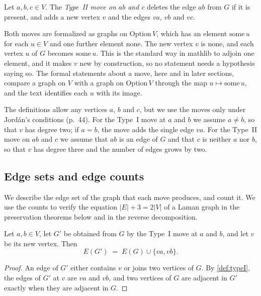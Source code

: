 \begin{definition}
  \label{def:typeII}
  \leanok
  Let $a, b, c \in V$. The \emph{Type~II move on $ab$ and $c$} deletes
  the edge $ab$ from $G$ if it is present, and adds a new vertex $v$
  and the edges $va$, $vb$ and $vc$.
\end{definition}
\begin{fmlnote}
  \label{fmlnote:henneberg-new-vertex}
  Both moves are formalized as graphs on $\mathrm{Option}\,V$, which
  has an element $\mathrm{some}\,u$ for each $u \in V$ and one further
  element $\mathrm{none}$. The new vertex $v$ is $\mathrm{none}$, and
  each vertex $u$ of $G$ becomes $\mathrm{some}\,u$. This is the
  standard way in mathlib to adjoin one element, and it makes $v$ new
  by construction, so no statement needs a hypothesis saying so. The
  formal statements about a move, here and in later sections, compare
  a graph on $V$ with a graph on $\mathrm{Option}\,V$ through the map
  $u \mapsto \mathrm{some}\,u$, and the text identifies each $u$ with
  its image.
\end{fmlnote}

The definitions allow any vertices $a$, $b$ and $c$, but we use the
moves only under Jord\'an's conditions (p.~44). For the Type~I move at
$a$ and $b$ we assume $a \ne b$, so that $v$ has degree two; if
$a = b$, the move adds the single edge $va$. For the Type~II move on
$ab$ and $c$ we assume that $ab$ is an edge of $G$ and that $c$ is
neither $a$ nor $b$, so that $v$ has degree three and the number of
edges grows by two.

\subsection{Edge sets and edge counts}

We describe the edge set of the graph that each move produces, and
count it. We use the counts to verify the equation $|E| + 3 = 2|V|$
of a Laman graph in the preservation theorems below and in the reverse
decomposition.

\begin{lemma}
  \label{lem:typeI-edgeSet}
  \leanok
  Let $a, b \in V$, let $G'$ be obtained from $G$ by the Type~I move
  at $a$ and $b$, and let $v$ be its new vertex. Then
  \[
    E(G') \;=\; E(G) \cup \{va, vb\}.
  \]
\end{lemma}
\begin{proof}
  \leanok
  An edge of $G'$ either contains $v$ or joins two vertices of $G$. By
  \cref{def:typeI}, the edges of $G'$ at $v$ are $va$ and $vb$, and two
  vertices of $G$ are adjacent in $G'$ exactly when they are adjacent
  in $G$.
\end{proof}

